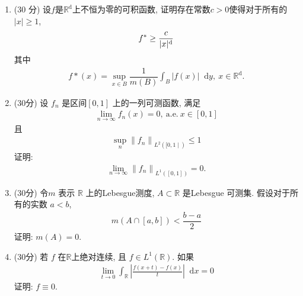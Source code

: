 \documentclass[space]{ctexart}
\def\dif{\mathop{}\!\mathrm{d}}
\begin{document}
\begin{enumerate}[itemsep=1.2em,topsep=0pt,left=2em]
\item (30 分) 设$f$是$\mathbb{R}^\mathrm{d}$上不恒为零的可积函数, 证明存在常数$c>0$使得对于所有的$|x|\geq 1$,
\begin{align*}
f^*\geq \dfrac{c}{|x|^{\rm d}}
\end{align*}
其中
\begin{align*}
f*(x)=\sup\limits_{x\in B}\dfrac{1}{m(B)}\int_{B}|f(x)|\dif y,~x\in \mathbb{R}^\mathrm{d}.
\end{align*}


\item (30分) 设 $ f_{n} $ 是区间$[0,1] $ 上的一列可测函数, 满足
\begin{align*}
\lim_{n \to \infty} f_{n}(x)=0, ~\text{a.e.}~ x \in [0,1]
\end{align*}
且
\begin{align*}
\sup\limits_{n}\left\|f_{n}\right\|_{L^{2}([0,1 \mid)} \leq 1
\end{align*}
证明:
\begin{align*}
\lim\limits_{n \to \infty}\left\|f_{n}\right\|_{L^{1}([0,1])}=0.
\end{align*}

\item (30分) 令$ m $ 表示 $ \mathbb{R}$ 上的Lebesgue测度,  $A \subset \mathbb{R} $ 是Lebesgue 可测集. 假设对于所有的实数  $a<b$,
    \begin{align*}
    m(A \cap[a, b])<\dfrac{b-a}{2}
    \end{align*}
    证明: $ m(A)=0 $.

\item (30分) 若 $ f $ 在$\mathbb{R}$上绝对连续, 且 $ f \in L^{1}(\mathbb{R}) $.  如果
\begin{align*}
\lim\limits_{t \to  0} \int_{\mathbb{R}}\left|\frac{f(x+t)-f(x)}{t}\right| \dif x=0
\end{align*}
证明: $ f \equiv 0 $.

\end{enumerate}

\clearpage	
\end{document}
